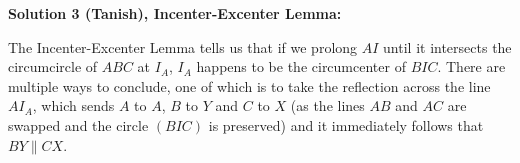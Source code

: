 \textbf{Solution 3 (Tanish), Incenter-Excenter Lemma:} 

The Incenter-Excenter Lemma tells us that if we prolong $AI$ until it intersects the circumcircle of $ABC$ at $I_A$, $I_A$ happens to be the circumcenter of $BIC$. There are multiple ways to conclude, one of which is to take the reflection across the line $AI_A$, which sends $A$ to $A$, $B$ to $Y$ and $C$ to $X$ (as the lines $AB$ and $AC$ are swapped and the circle $(BIC)$ is preserved) and it immediately follows that $BY \parallel CX$. 





